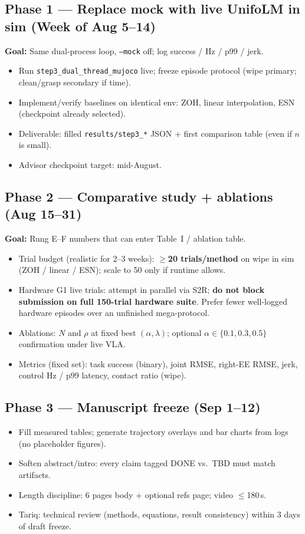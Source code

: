 \documentclass[conference]{IEEEtran}
\begin{document}
\subsection{Phase 1 --- Replace mock with live UnifoLM in sim (Week of Aug 5--14)}
\textbf{Goal:} Same dual-process loop, \texttt{--mock} off; log success / Hz / p99 / jerk.
\begin{itemize}
    \item Run \texttt{step3\_dual\_thread\_mujoco} live; freeze episode protocol (wipe primary; clean/grasp secondary if time).
    \item Implement/verify baselines on identical env: ZOH, linear interpolation, ESN (checkpoint already selected).
    \item Deliverable: filled \texttt{results/step3\_*} JSON + first comparison table (even if $n$ is small).
    \item Advisor checkpoint target: mid-August.
\end{itemize}

\subsection{Phase 2 --- Comparative study + ablations (Aug 15--31)}
\textbf{Goal:} Rung E--F numbers that can enter Table~I / ablation table.
\begin{itemize}
    \item Trial budget (realistic for 2--3 weeks): \textbf{$\geq$20 trials/method} on wipe in sim (ZOH / linear / ESN); scale to 50 only if runtime allows.
    \item Hardware G1 live trials: attempt in parallel via S2R; \textbf{do not block submission on full 150-trial hardware suite}.
        Prefer fewer well-logged hardware episodes over an unfinished mega-protocol.
    \item Ablations: $N$ and $\rho$ at fixed best $(\alpha,\lambda)$; optional $\alpha\in\{0.1,0.3,0.5\}$ confirmation under live VLA.
    \item Metrics (fixed set): task success (binary), joint RMSE, right-EE RMSE, jerk, control Hz / p99 latency, contact ratio (wipe).
\end{itemize}

\subsection{Phase 3 --- Manuscript freeze (Sep 1--12)}
\begin{itemize}
    \item Fill measured tables; generate trajectory overlays and bar charts from logs (no placeholder figures).
    \item Soften abstract/intro: every claim tagged DONE vs.\ TBD must match artifacts.
    \item Length discipline: 6 pages body + optional refs page; video $\leq$180\,s.
    \item Tariq: technical review (methods, equations, result consistency) within 3 days of draft freeze.
\end{itemize}
\end{document}
